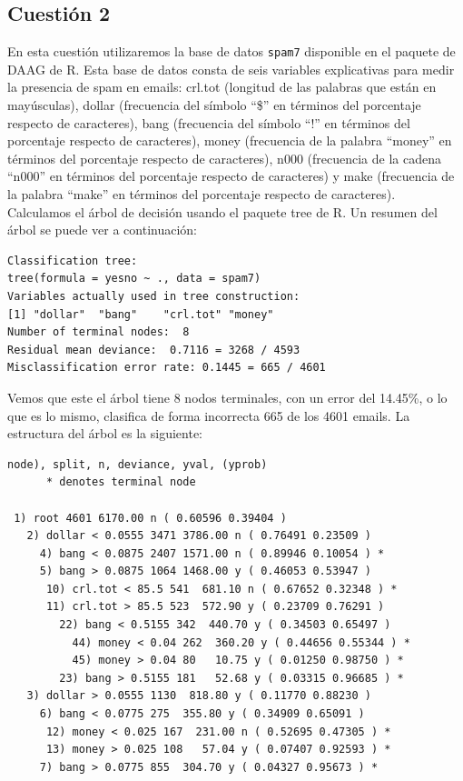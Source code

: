 \documentclass[12pt,a4paper,twoside,openright,titlepage,final]{article}
\begin{document}
\subsection{Cuestión 2}

En esta cuestión utilizaremos la base de datos \texttt{spam7} disponible en el paquete de DAAG de R. Esta base de datos consta de seis variables explicativas para medir la presencia de spam en emails: crl.tot (longitud de las palabras que están en mayúsculas), dollar (frecuencia del símbolo ``\$'' en términos del porcentaje respecto de caracteres), bang (frecuencia del símbolo ``!'' en términos del porcentaje respecto de caracteres), money (frecuencia de la palabra ``money'' en términos del porcentaje respecto de caracteres), n000 (frecuencia de la cadena ``n000'' en términos del porcentaje respecto de caracteres) y make (frecuencia de la palabra ``make'' en términos del porcentaje respecto de caracteres).\\

Calculamos el árbol de decisión usando el paquete tree de R. Un resumen del árbol se puede ver a continuación:

\begin{verbatim}
Classification tree:
tree(formula = yesno ~ ., data = spam7)
Variables actually used in tree construction:
[1] "dollar"  "bang"    "crl.tot" "money"  
Number of terminal nodes:  8 
Residual mean deviance:  0.7116 = 3268 / 4593 
Misclassification error rate: 0.1445 = 665 / 4601 
\end{verbatim}

Vemos que este el árbol tiene 8 nodos terminales, con un error del 14.45\%, o lo que es lo mismo, clasifica de forma incorrecta 665 de los 4601 emails. La estructura del árbol es la siguiente:

\begin{verbatim}
node), split, n, deviance, yval, (yprob)
      * denotes terminal node

 1) root 4601 6170.00 n ( 0.60596 0.39404 )  
   2) dollar < 0.0555 3471 3786.00 n ( 0.76491 0.23509 )  
     4) bang < 0.0875 2407 1571.00 n ( 0.89946 0.10054 ) *
     5) bang > 0.0875 1064 1468.00 y ( 0.46053 0.53947 )  
      10) crl.tot < 85.5 541  681.10 n ( 0.67652 0.32348 ) *
      11) crl.tot > 85.5 523  572.90 y ( 0.23709 0.76291 )  
        22) bang < 0.5155 342  440.70 y ( 0.34503 0.65497 )  
          44) money < 0.04 262  360.20 y ( 0.44656 0.55344 ) *
          45) money > 0.04 80   10.75 y ( 0.01250 0.98750 ) *
        23) bang > 0.5155 181   52.68 y ( 0.03315 0.96685 ) *
   3) dollar > 0.0555 1130  818.80 y ( 0.11770 0.88230 )  
     6) bang < 0.0775 275  355.80 y ( 0.34909 0.65091 )  
      12) money < 0.025 167  231.00 n ( 0.52695 0.47305 ) *
      13) money > 0.025 108   57.04 y ( 0.07407 0.92593 ) *
     7) bang > 0.0775 855  304.70 y ( 0.04327 0.95673 ) *
\end{verbatim}
\end{document}
